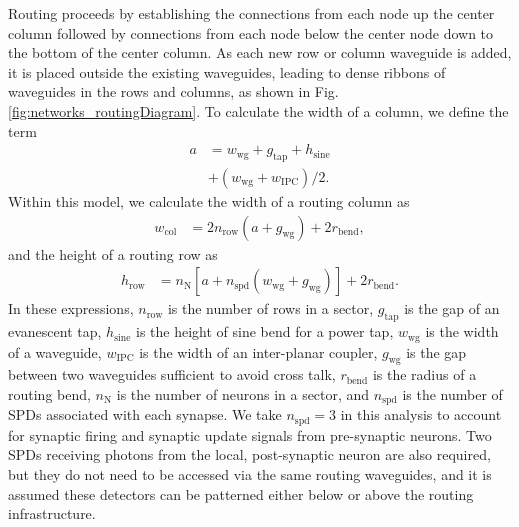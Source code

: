\documentclass[aip,amsmath,amssymb,reprint,nofootinbib]{revtex4-1}
\begin{document}
Routing proceeds by establishing the connections from each node up the center column followed by connections from each node below the center node down to the bottom of the center column. As each new row or column waveguide is added, it is placed outside the existing waveguides, leading to dense ribbons of waveguides in the rows and columns, as shown in Fig. \ref{fig:networks_routingDiagram}. To calculate the width of a column, we define the term
\begin{equation}
\label{eq:a}
\begin{split}
a & = w_{\mathrm{wg}}+g_{\mathrm{tap}}+h_{\mathrm{sine}} \\
& +(w_{\mathrm{wg}}+w_{\mathrm{IPC}})/2.
\end{split}
\end{equation}
Within this model, we calculate the width of a routing column as
\begin{equation}
\label{eq:wCol}
\begin{split}
w_{\mathrm{col}} &= 2 n_{\mathrm{row}}(a+g_{\mathrm{wg}})+2r_{\mathrm{bend}},
\end{split}
\end{equation}
and the height of a routing row as
\begin{equation}
\label{eq:hRow}
\begin{split}
h_{\mathrm{row}} &= n_{\mathrm{N}}\left[a+n_{\mathrm{spd}}(w_{\mathrm{wg}}+g_{\mathrm{wg}})\right]+2r_{\mathrm{bend}}.
\end{split}
\end{equation}
In these expressions, $n_{\mathrm{row}}$ is the number of rows in a sector, $g_{\mathrm{tap}}$ is the gap of an evanescent tap, $h_{\mathrm{sine}}$ is the height of sine bend for a power tap, $w_{\mathrm{wg}}$ is the width of a waveguide, $w_{\mathrm{IPC}}$ is the width of an inter-planar coupler, $g_{\mathrm{wg}}$ is the gap between two waveguides sufficient to avoid cross talk, $r_{\mathrm{bend}}$ is the radius of a routing bend, $n_{\mathrm{N}}$ is the number of neurons in a sector, and $n_{\mathrm{spd}}$ is the number of SPDs associated with each synapse. We take $n_{\mathrm{spd}}=3$ in this analysis to account for synaptic firing and synaptic update signals from pre-synaptic neurons. Two SPDs receiving photons from the local, post-synaptic neuron are also required, but they do not need to be accessed via the same routing waveguides, and it is assumed these detectors can be patterned either below or above the routing infrastructure. 
\end{document}
